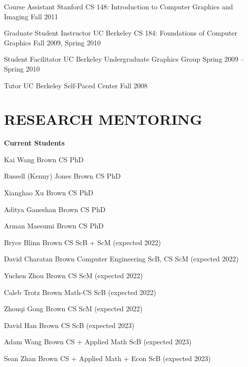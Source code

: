 \documentclass[line,margin]{res}
\begin{document}
\begin{resume}
\teach
{Course Assistant}
{Stanford CS 148: Introduction to Computer Graphics and Imaging}
{Fall 2011}

\teach
{Graduate Student Instructor}
{UC Berkeley CS 184: Foundations of Computer Graphics}
{Fall 2009, Spring 2010}

\teach
{Student Facilitator}
{UC Berkeley Undergraduate Graphics Group}
{Spring 2009 -- Spring 2010}

\teach
{Tutor}
{UC Berkeley Self-Paced Center}
{Fall 2008}


\section{RESEARCH MENTORING}

\newcommand{\currentphd}[2] {
	#1 \hfill #2
}

\newcommand{\student}[3] {
	#1 \hfill #2 (expected #3)
}

\newcommand{\alumni}[4] {
	#1 \hfill #2 #3\\
	\emph{Next position: #4}
}

\newcommand{\visitor}[4] {
	#1 \hfill #2 #3\\
	\emph{Home institution: #4}
}


\textbf{Current Students}

\currentphd
{Kai Wang}
{Brown CS PhD}

\currentphd
{Russell (Kenny) Jones}
{Brown CS PhD}

\currentphd
{Xianghao Xu}
{Brown CS PhD}

\currentphd
{Aditya Ganeshan}
{Brown CS PhD}

\currentphd
{Arman Maesumi}
{Brown CS PhD}

\student
{Bryce Blinn}
{Brown CS ScB + ScM}
{2022}	

\student
{David Charatan}
{Brown Computer Engineering ScB, CS ScM}
{2022}

\student
{Yuchen Zhou}
{Brown CS ScM}
{2022}

\student
{Caleb Trotz}
{Brown Math-CS ScB}
{2022}

\student
{Zhouqi Gong}
{Brown CS ScM}
{2022}

\student
{David Han}
{Brown CS ScB}
{2023}

\student
{Adam Wang}
{Brown CS + Applied Math ScB}
{2023}

\student
{Sean Zhan}
{Brown CS + Applied Math + Econ ScB}
{2023}
\\


\end{resume}
\end{document}

